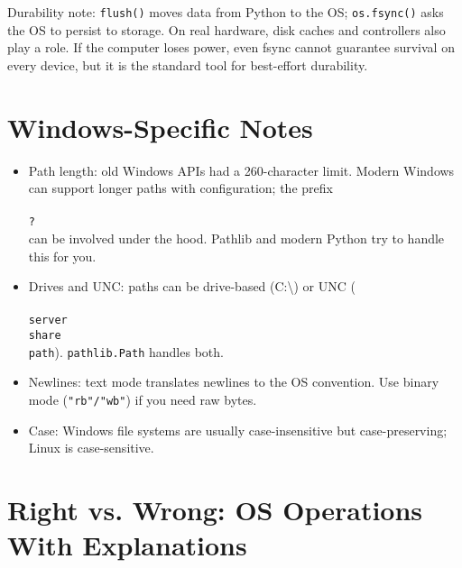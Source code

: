 \noindent
Durability note: \texttt{flush()} moves data from Python to the OS; \texttt{os.fsync()} asks the OS to persist to storage. On real hardware, disk caches and controllers also play a role. If the computer loses power, even fsync cannot guarantee survival on every device, but it is the standard tool for best-effort durability.

\section{Windows-Specific Notes}

\begin{itemize}
  \item Path length: old Windows APIs had a 260-character limit. Modern Windows can support longer paths with configuration; the prefix \texttt{\\\\?\\} can be involved under the hood. Pathlib and modern Python try to handle this for you.
  \item Drives and UNC: paths can be drive-based (C:\textbackslash) or UNC (\texttt{\\\\server\\share\\path}). \texttt{pathlib.Path} handles both.
  \item Newlines: text mode translates newlines to the OS convention. Use binary mode (\texttt{"rb"/"wb"}) if you need raw bytes.
  \item Case: Windows file systems are usually case-insensitive but case-preserving; Linux is case-sensitive.
\end{itemize}

\section{Right vs. Wrong: OS Operations With Explanations}

